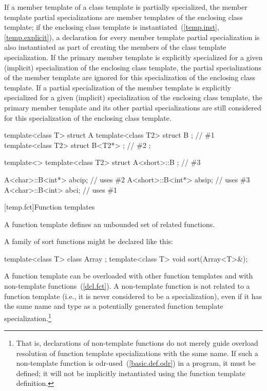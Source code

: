 \pnum
If a member template of a class template is partially specialized,
the member template partial specializations are member templates of
the enclosing class template;
if the enclosing class template is instantiated~(\ref{temp.inst}, \ref{temp.explicit}),
a declaration for every member template partial specialization is also
instantiated as part of creating the members of the class template
specialization.
If the primary member template is explicitly specialized for a given
(implicit) specialization of the enclosing class template,
the partial specializations of the member template are ignored for this
specialization of the enclosing class template.
If a partial specialization of the member template is explicitly specialized
for a given (implicit) specialization of the enclosing class template,
the primary member template and its other partial specializations are
still considered for this specialization of the enclosing class template.
\begin{example}

\begin{codeblock}
template<class T> struct A {
  template<class T2> struct B {};                     // \#1
  template<class T2> struct B<T2*> {};                // \#2
};

template<> template<class T2> struct A<short>::B {};  // \#3

A<char>::B<int*>  abcip;  // uses \#2
A<short>::B<int*> absip;  // uses \#3
A<char>::B<int>  abci;    // uses \#1
\end{codeblock}
\end{example}

[temp.fct]{Function templates}

\pnum
A function template defines an unbounded set of related functions.
\begin{example}
A family of sort functions might be declared like this:

\begin{codeblock}
template<class T> class Array { };
template<class T> void sort(Array<T>&);
\end{codeblock}
\end{example}

\pnum
A function template can be overloaded with other function templates
and with non-template functions~(\ref{dcl.fct}).
A non-template function is not
related to a function template
(i.e., it is never considered to be a specialization),
even if it has the same name and type
as a potentially generated function template specialization.\footnote{That is,
declarations of non-template functions do not merely guide
overload resolution of
function template specializations
with the same name.
If such a non-template function is odr-used~(\ref{basic.def.odr}) in a program, it must be defined;
it will not be implicitly instantiated using the function template definition.}

